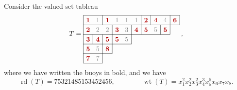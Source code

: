 \documentclass[ALCO,ThmDefs,Unicode,epreuves]{cedram}
\DeclareMathOperator{\wt}{wt} %
\DeclareMathOperator{\rd}{rd} %
\begin{document}
\begin{exam}
\label{ex:buoy_reading_word}
Consider the valued-set tableau
\[
T = 
\begin{tikzpicture}[scale=0.5,baseline=-30]
\foreach \i/\r in {0/10,1/10,2/9,3/5,4/3,5/2}
    \draw (0,-\i) -- (\r,-\i);
\draw (0,0) -- (0,-5);
\draw (1,-2) -- (1,-3);
\draw (2,0) -- (2,-1);
\draw (2,-2) -- (2,-5);
\draw (3,-1) -- (3,-4);
\draw (5,-1) -- (5,-3);
\draw (6,0) -- (6,-2);
\draw (7,0) -- (7,-1);
\draw (8,-1) -- (8,-2);
\draw (9,0) -- (9,-2);
\draw (10,0) -- (10,-1);
\draw (0.5,-0.5) node {$\mathbf{\color{darkred}1}$};
\draw (2.5,-0.5) node {$\mathbf{\color{darkred}1}$};
\foreach \i in {1,3,4,5}
    \draw (\i+0.5,-0.5) node[gray] {$1$};
\draw (6.5,-0.5) node {$\mathbf{\color{darkred}2}$};
\draw (0.5,-1.5) node {$\mathbf{\color{darkred}2}$};
\foreach \i in {1,2}
    \draw (\i+0.5,-1.5) node[gray] {$2$};
\draw (0.5,-2.5) node {$\mathbf{\color{darkred}3}$};
\draw (3.5,-1.5) node {$\mathbf{\color{darkred}3}$};
\draw (4.5,-1.5) node[gray] {$3$};
\draw (7.5,-0.5) node {$\mathbf{\color{darkred}4}$};
\draw (8.5,-0.5) node[gray] {$4$};
\draw (5.5,-1.5) node {$\mathbf{\color{darkred}4}$};
\draw (1.5,-2.5) node {$\mathbf{\color{darkred}4}$};
\draw (6.5,-1.5) node {$\mathbf{\color{darkred}5}$};
\draw (7.5,-1.5) node[gray] {$5$};
\draw (8.5,-1.5) node {$\mathbf{\color{darkred}5}$};
\draw (2.5,-2.5) node {$\mathbf{\color{darkred}5}$};
\draw (3.5,-2.5) node {$\mathbf{\color{darkred}5}$};
\draw (4.5,-2.5) node[gray] {$5$};
\draw (0.5,-3.5) node {$\mathbf{\color{darkred}5}$};
\draw (1.5,-3.5) node[gray] {$5$};
\draw (9.5,-0.5) node {$\mathbf{\color{darkred}6}$};
\draw (0.5,-4.5) node {$\mathbf{\color{darkred}7}$};
\draw (1.5,-4.5) node[gray] {$7$};
\draw (2.5,-3.5) node {$\mathbf{\color{darkred}8}$};
\end{tikzpicture}\,,
\]
where we have written the buoys in bold, and we have
\[
\rd(T) = 75321485153452456,
\qquad\qquad
\wt(T) = x_1^2 x_2^2 x_3^2 x_4^3 x_5^5 x_6 x_7 x_8.
\]
\end{exam}
\end{document}

